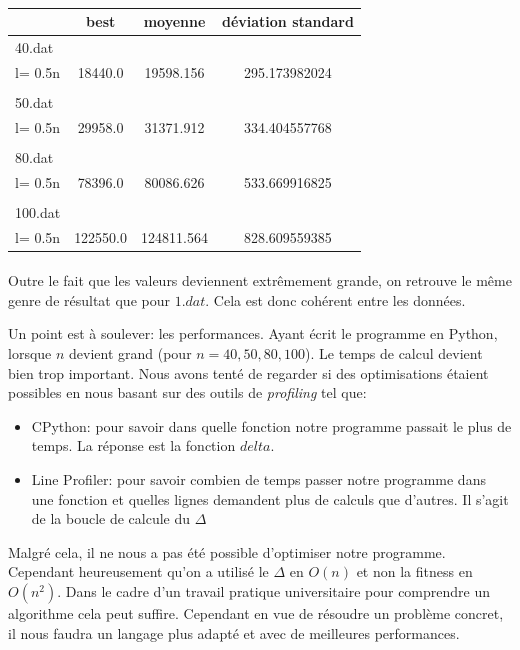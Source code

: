 \documentclass[a4paper, 11pt]{article}
\begin{document}
\paragraph{}
\begin{tabular}{|l|c|c|c|}
\hline
 & best & moyenne & déviation standard\\
\hline
40.dat & & & \\
\hline
l= 0.5n &18440.0 &19598.156 &295.173982024\\
\hline
 & & & \\
 \hline
50.dat & & & \\
\hline
l= 0.5n &29958.0 & 31371.912 & 334.404557768\\
\hline
 & & & \\
 \hline
80.dat & & & \\
\hline
l= 0.5n & 78396.0 & 80086.626 & 533.669916825\\
\hline
 & & & \\
100.dat & & & \\
\hline
l= 0.5n & 122550.0 & 124811.564 & 828.609559385\\

\hline
\end{tabular}
\paragraph{}
Outre le fait que les valeurs deviennent extrêmement grande, on retrouve le même genre de résultat que pour $1.dat$. Cela est donc
cohérent entre les données.

Un point est à soulever: les performances. Ayant écrit le programme en Python, lorsque $n$ devient grand (pour $n=40,50,80,100$).
Le temps de calcul devient bien trop important. Nous avons tenté de regarder si des optimisations étaient possibles en nous basant sur des
outils de \textit{profiling} tel que:
\begin{itemize}
 \item CPython: pour savoir dans quelle fonction notre programme passait le plus de temps. La réponse est la fonction $delta$.
 \item Line Profiler: pour savoir combien de temps passer notre programme dans une fonction et quelles lignes demandent plus de calculs
 que d'autres. Il s'agit de la boucle de calcule du $\Delta$
\end{itemize}
Malgré cela, il ne nous a pas été possible d'optimiser notre programme. Cependant heureusement qu'on a utilisé le $\Delta$ en $O(n)$ et 
non la fitness en $O(n^2)$.
Dans le cadre d'un travail pratique universitaire pour comprendre un algorithme cela peut suffire. 
Cependant en vue de résoudre un problème concret, il nous faudra un langage plus adapté et avec de meilleures performances.
\end{document}
